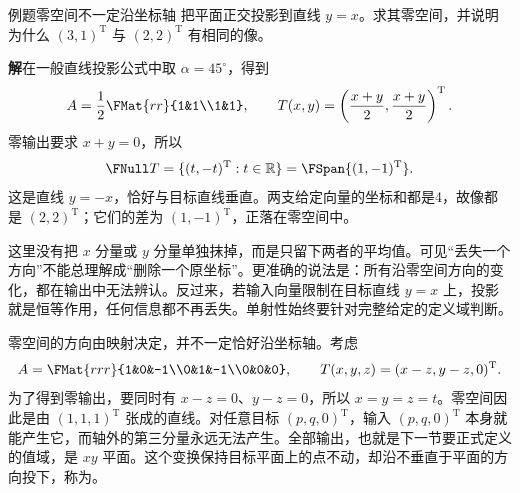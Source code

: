 \documentclass[a4paper,12pt,twoside,openany,fontset=none]{ctexbook}
\newcounter{example}[chapter]
\newenvironment{example}[1][]{\begin{exBox}{例题}{#1}}{\end{exBox}}
\numberwithin{equation}{chapter}
\begin{document}
\begin{example}[零空间不一定沿坐标轴]
把平面正交投影到直线 $y=x$。求其零空间，并说明为什么 $(3,1)^{\mathrm T}$ 与 $(2,2)^{\mathrm T}$ 有相同的像。
\end{example}
\textbf{解}\quad 在一般直线投影公式中取 $\alpha=45^\circ$，得到
\[
 A=\frac12\FMat{rr}{1&1\\1&1},\qquad
 T(x,y)=\left(\frac{x+y}{2},\frac{x+y}{2}\right)^{\mathrm T}.
\]
零输出要求 $x+y=0$，所以
\[
 \FNull T=\{(t,-t)^{\mathrm T}:t\in\mathbb R\}
 =\FSpan\{(1,-1)^{\mathrm T}\}.
\]
这是直线 $y=-x$，恰好与目标直线垂直。两支给定向量的坐标和都是4，故像都是 $(2,2)^{\mathrm T}$；它们的差为 $(1,-1)^{\mathrm T}$，正落在零空间中。

这里没有把 $x$ 分量或 $y$ 分量单独抹掉，而是只留下两者的平均值。可见“丢失一个方向”不能总理解成“删除一个原坐标”。更准确的说法是：所有沿零空间方向的变化，都在输出中无法辨认。反过来，若输入向量限制在目标直线 $y=x$ 上，投影就是恒等作用，任何信息都不再丢失。单射性始终要针对完整给定的定义域判断。

零空间的方向由映射决定，并不一定恰好沿坐标轴。考虑
\[
 A=\FMat{rrr}{1&0&-1\\0&1&-1\\0&0&0},\qquad
 T(x,y,z)=(x-z,y-z,0)^{\mathrm T}.
\]
为了得到零输出，要同时有 $x-z=0$、$y-z=0$，所以 $x=y=z=t$。零空间因此是由 $(1,1,1)^{\mathrm T}$ 张成的直线。对任意目标 $(p,q,0)^{\mathrm T}$，输入 $(p,q,0)^{\mathrm T}$ 本身就能产生它，而轴外的第三分量永远无法产生。全部输出，也就是下一节要正式定义的值域，是 $xy$ 平面。这个变换保持目标平面上的点不动，却沿不垂直于平面的方向投下，称为。
\end{document}
